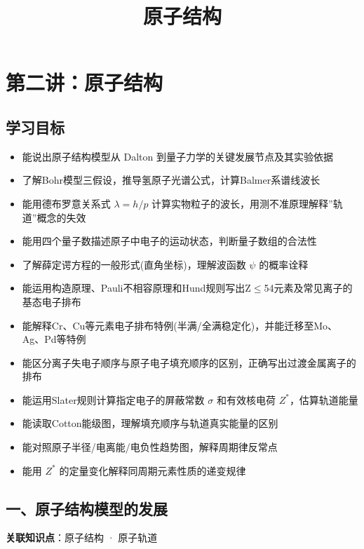 \documentclass[a4paper,11pt]{ctexart}
\title{原子结构}
\date{}
\providecommand{\tightlist}{\setlength{\itemsep}{0pt}\setlength{\parskip}{0pt}}
\newcommand{\箭}{\ensuremath{\rightarrow}}
\newcommand{\左箭}{\ensuremath{\leftarrow}}
\newcommand{\上箭}{\ensuremath{\uparrow}}
\newcommand{\下箭}{\ensuremath{\downarrow}}
\newcommand{\衡}{\ensuremath{\rightleftharpoons}}
\newcommand{\双箭}{\ensuremath{\leftrightarrow}}
\newcommand{\约等于}{\ensuremath{\approx}}
\newcommand{\小于等于}{\ensuremath{\leq}}
\newcommand{\大于等于}{\ensuremath{\geq}}
\newcommand{\不等于}{\ensuremath{\neq}}
\newcommand{\西格马}{\ensuremath{\sigma}}
\newcommand{\派}{\ensuremath{\pi}}
\begin{document}
\maketitle
\tableofcontents
\newpage
\section{第二讲：原子结构}\label{ux7b2cux4e8cux8bb2ux539fux5b50ux7ed3ux6784}

\subsection{学习目标}\label{ux5b66ux4e60ux76eeux6807}

\begin{itemize}
\tightlist
\item
  能说出原子结构模型从 Dalton 到量子力学的关键发展节点及其实验依据
\item
  了解Bohr模型三假设，推导氢原子光谱公式，计算Balmer系谱线波长
\item
  能用德布罗意关系式 \(\lambda = h/p\) 计算实物粒子的波长，用测不准原理解释''轨道''概念的失效
\item
  能用四个量子数描述原子中电子的运动状态，判断量子数组的合法性
\item
  了解薛定谔方程的一般形式(直角坐标)，理解波函数 \(\psi\) 的概率诠释
\item
  能运用构造原理、Pauli不相容原理和Hund规则写出Z\小于等于54元素及常见离子的基态电子排布
\item
  能解释Cr、Cu等元素电子排布特例(半满/全满稳定化)，并能迁移至Mo、Ag、Pd等特例
\item
  能区分离子失电子顺序与原子电子填充顺序的区别，正确写出过渡金属离子的排布
\item
  能运用Slater规则计算指定电子的屏蔽常数 \(\sigma\) 和有效核电荷 \(Z^*\)，估算轨道能量
\item
  能读取Cotton能级图，理解填充顺序与轨道真实能量的区别
\item
  能对照原子半径/电离能/电负性趋势图，解释周期律反常点
\item
  能用 \(Z^*\) 的定量变化解释同周期元素性质的递变规律
\end{itemize}

\subsection{一、原子结构模型的发展}\label{ux4e00ux539fux5b50ux7ed3ux6784ux6a21ux578bux7684ux53d1ux5c55}

\textbf{关联知识点}：原子结构 · 原子轨道
\end{document}
